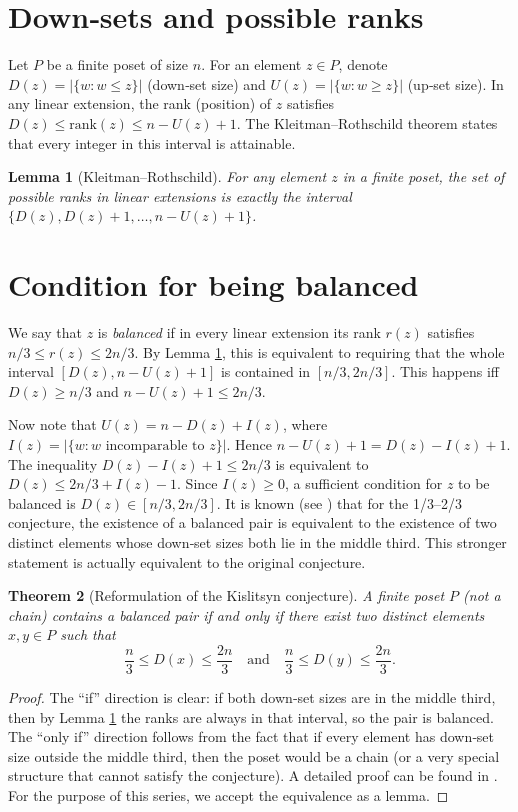 \documentclass[11pt,a4paper]{article}
\newtheorem{theorem}{Theorem}[section]
\newtheorem{lemma}[theorem]{Lemma}
\begin{document}
\section{Down‑sets and possible ranks}

Let $P$ be a finite poset of size $n$. For an element $z\in P$, denote $D(z) = |\{w : w \le z\}|$ (down‑set size) and $U(z) = |\{w : w \ge z\}|$ (up‑set size). In any linear extension, the rank (position) of $z$ satisfies $D(z) \le \mathrm{rank}(z) \le n - U(z) + 1$. The Kleitman–Rothschild theorem states that every integer in this interval is attainable.

\begin{lemma}[Kleitman–Rothschild]
\label{lem:attainability}
For any element $z$ in a finite poset, the set of possible ranks in linear extensions is exactly the interval $\{D(z), D(z)+1, \dots, n-U(z)+1\}$.
\end{lemma}

\section{Condition for being balanced}

We say that $z$ is \emph{balanced} if in every linear extension its rank $r(z)$ satisfies $n/3 \le r(z) \le 2n/3$. By Lemma \ref{lem:attainability}, this is equivalent to requiring that the whole interval $[D(z), n-U(z)+1]$ is contained in $[n/3, 2n/3]$. This happens iff $D(z) \ge n/3$ and $n-U(z)+1 \le 2n/3$.

Now note that $U(z) = n - D(z) + I(z)$, where $I(z) = |\{w : w \text{ incomparable to } z\}|$. Hence $n-U(z)+1 = D(z) - I(z) + 1$. The inequality $D(z) - I(z) + 1 \le 2n/3$ is equivalent to $D(z) \le 2n/3 + I(z) - 1$. Since $I(z) \ge 0$, a sufficient condition for $z$ to be balanced is $D(z) \in [n/3, 2n/3]$. It is known (see \cite{brightwell1992}) that for the 1/3–2/3 conjecture, the existence of a balanced pair is equivalent to the existence of two distinct elements whose down‑set sizes both lie in the middle third. This stronger statement is actually equivalent to the original conjecture.

\begin{theorem}[Reformulation of the Kislitsyn conjecture]
\label{thm:reform}
A finite poset $P$ (not a chain) contains a balanced pair if and only if there exist two distinct elements $x,y\in P$ such that
\[
\frac{n}{3} \le D(x) \le \frac{2n}{3}\quad\text{and}\quad \frac{n}{3} \le D(y) \le \frac{2n}{3}.
\]
\end{theorem}
\begin{proof}
The “if” direction is clear: if both down‑set sizes are in the middle third, then by Lemma \ref{lem:attainability} the ranks are always in that interval, so the pair is balanced. The “only if” direction follows from the fact that if every element has down‑set size outside the middle third, then the poset would be a chain (or a very special structure that cannot satisfy the conjecture). A detailed proof can be found in \cite{brightwell1992}. For the purpose of this series, we accept the equivalence as a lemma.
\end{proof}
\end{document}
